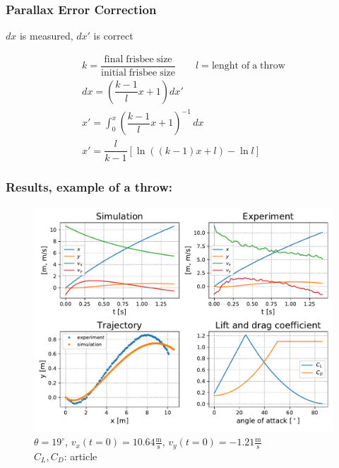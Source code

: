 \documentclass{beamer}
\begin{document}

\begin{frame}

\frametitle{Parallax Error Correction}

\(dx\) is measured, \(dx'\) is correct

\begin{gather}
k = \dfrac{\mathrm{final \; frisbee \; size}}{\mathrm{initial \;  frisbee  \; size}} \qquad l = \mathrm{lenght \; of \; a \; throw}\\
dx = \left( \dfrac{k - 1}{l} x + 1 \right) dx' \\
x' = \int_{0}^{x} \left( \dfrac{k - 1}{l} x + 1 \right)^{-1} \,dx \\
x' = \dfrac{l}{k - 1} \left[ \ln((k - 1) x + l) - \ln l \right]
\end{gather}

\end{frame}


\begin{frame}

\frametitle{Results, example of a throw:}

\begin{figure}[H]
	\centering
	  \includegraphics[width=0.85 \textwidth]{strmo_clanek_vse.pdf}
	  \captionsetup{justification=centering,margin=0cm}
	  \caption{$\theta = 19 ^{\circ}$, $v_x(t = 0) = 10.64 \mathrm{\frac{m}{s}}$, $v_y(t = 0) = -1.21 \mathrm{\frac{m}{s}}$ \\
	  $C_L, C_D$: article \cite{clanek}}
\end{figure}


\end{frame}
\end{document}
